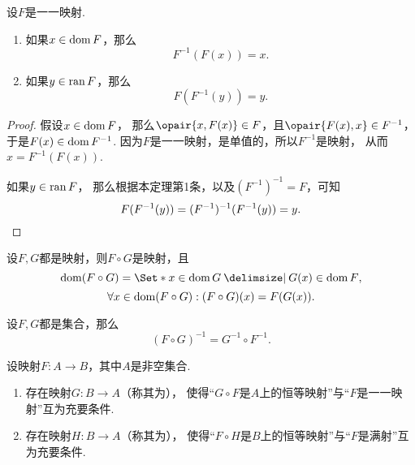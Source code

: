 \begin{theorem}
设\(F\)是一一映射.
\begin{enumerate}
	\item 如果\(x \in \operatorname{dom} F\)，那么\[
		F^{-1}(F(x)) = x.
	\]

	\item 如果\(y \in \operatorname{ran} F\)，那么\[
		F(F^{-1}(y)) = y.
	\]
\end{enumerate}
\begin{proof}
假设\(x \in \operatorname{dom} F\)，
那么\(\opair{x,F(x)} \in F\)，且\(\opair{F(x),x} \in F^{-1}\)，
于是\(F(x) \in \operatorname{dom} F^{-1}\).
因为\(F\)是一一映射，是单值的，所以\(F^{-1}\)是映射，
从而\(x = F^{-1}(F(x))\).

如果\(y \in \operatorname{ran} F\)，
那么根据本定理第1条，以及\((F^{-1})^{-1} = F\)，可知\[
	F(F^{-1}(y)) = (F^{-1})^{-1}(F^{-1}(y)) = y.
	\qedhere
\]
\end{proof}
\end{theorem}

\begin{theorem}
设\(F,G\)都是映射，则\(F \circ G\)是映射，且\[
	\dom(F \circ G)
	= \Set*{ x \in \dom G \given G(x) \in \dom F },
\]\[
	\forall x \in \operatorname{dom}(F \circ G):
	(F \circ G)(x) = F(G(x)).
\]
\end{theorem}

\begin{theorem}
设\(F,G\)都是集合，那么\[
	(F \circ G)^{-1} = G^{-1} \circ F^{-1}.
\]
\end{theorem}

\begin{theorem}
设映射\(F\colon A \to B\)，其中\(A\)是非空集合.
\begin{enumerate}
	\item 存在映射\(G\colon B \to A\)（称其为），
	使得“\(G \circ F\)是\(A\)上的恒等映射”与“\(F\)是一一映射”互为充要条件.

	\item 存在映射\(H\colon B \to A\)（称其为），
	使得“\(F \circ H\)是\(B\)上的恒等映射”与“\(F\)是满射”互为充要条件.
\end{enumerate}
\end{theorem}

